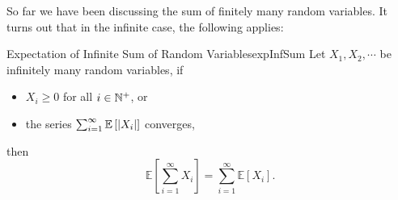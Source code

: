 \documentclass[math]{amznotes}
\theoremstyle{remark}
\newcommand{\0}{\mathbf{0}}
\newcommand{\1}{\mathbf{1}}
\begin{document}
So far we have been discussing the sum of finitely many random variables. It turns out that in the infinite case, the following applies:
\begin{thmbox}{Expectation of Infinite Sum of Random Variables}{expInfSum}
    Let $X_1, X_2, \cdots$ be infinitely many random variables, if 
    \begin{itemize}
        \item $X_i \geq 0$ for all $i \in \mathbb{N}^+$, or
        \item the series $\sum_{i = 1}^{\infty}\mathbb{E}\left[{\left\lvert {X_i} \right\rvert}\right]$ converges,
    \end{itemize}
    then 
    \begin{equation*}
        \mathbb{E}\left[\sum_{i = 1}^{\infty}X_i\right] = \sum_{i = 1}^{\infty}\mathbb{E}[X_i].
    \end{equation*}
\end{thmbox}
\end{document}

